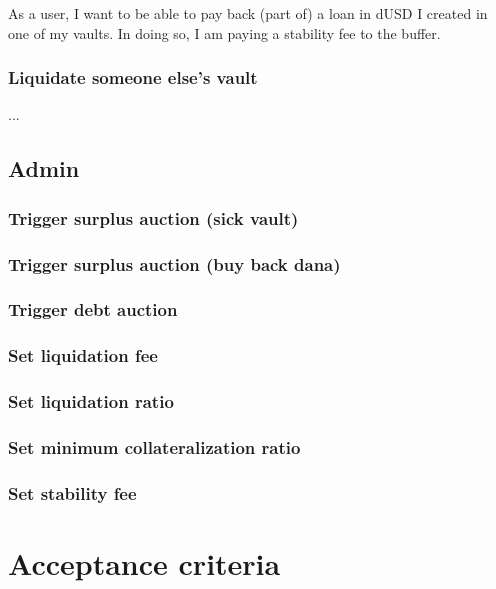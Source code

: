 \documentclass{article} %
\begin{document}
As a user, I want to be able to pay back (part of) a loan in dUSD I created in
one of my vaults. In doing so, I am paying a stability fee to the buffer.

\subsubsection{Liquidate someone else's vault}

...

\subsection{Admin}

\subsubsection{Trigger surplus auction (sick vault)}

\subsubsection{Trigger surplus auction (buy back dana)}

\subsubsection{Trigger debt auction}

\subsubsection{Set liquidation fee}

\subsubsection{Set liquidation ratio}

\subsubsection{Set minimum collateralization ratio}

\subsubsection{Set stability fee}

\section{Acceptance criteria}
\end{document}
